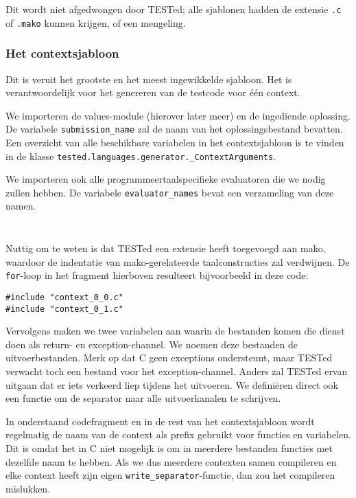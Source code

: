 Dit wordt niet afgedwongen door TESTed;
alle sjablonen hadden de extensie \texttt{.c} of \texttt{.mako} kunnen krijgen, of een mengeling.

\subsubsection{Het contextsjabloon}

Dit is veruit het grootste en het meest ingewikkelde sjabloon.
Het is verantwoordelijk voor het genereren van de testcode voor één context.

We importeren de values-module (hierover later meer) en de ingediende oplossing.
De variabele \texttt{submission\_name} zal de naam van het oplossingsbestand bevatten.
Een overzicht van alle beschikbare variabelen in het contextsjabloon is te vinden in de klasse \texttt{tested.languages.generator.\_ContextArguments}.

We importeren ook alle programmeertaalspecifieke evaluatoren die we nodig zullen hebben.
De variabele \texttt{evaluator\_names} bevat een verzameling van deze namen.

\inputminted[firstline=3,lastline=7]{mako}{sources/c-context.mako}
\vspace{-1.7cm} %
\inputminted[firstline=9,lastline=11]{mako}{sources/c-context.mako}

Nuttig om te weten is dat TESTed een extensie heeft toegevoegd aan mako, waardoor de indentatie van mako-gerelateerde taalconstructies zal verdwijnen.
De \texttt{for}-loop in het fragment hierboven resulteert bijvoorbeeld in deze code:

\begin{verbatim}
#include "context_0_0.c"
#include "context_0_1.c"
\end{verbatim}

Vervolgens maken we twee variabelen aan waarin de bestanden komen die dienst doen als return- en exception-channel.
We noemen deze bestanden de uitvoerbestanden.
Merk op dat C geen exceptions ondersteunt, maar TESTed verwacht toch een bestand voor het exception-channel.
Anders zal TESTed ervan uitgaan dat er iets verkeerd liep tijdens het uitvoeren.
We definiëren direct ook een functie om de separator naar alle uitvoerkanalen te schrijven.

In onderstaand codefragment en in de rest van het contextsjabloon wordt regelmatig de naam van de context als prefix gebruikt voor functies en variabelen.
Dit is omdat het in C niet mogelijk is om in meerdere bestanden functies met dezelfde naam te hebben.
Als we dus meerdere contexten samen compileren en elke context heeft zijn eigen \texttt{write\_separator}-functie, dan zou het compileren mislukken.

